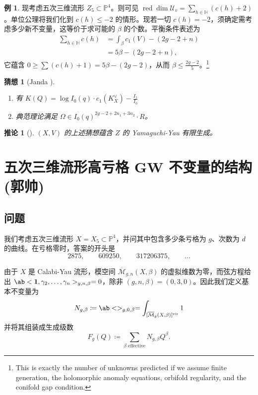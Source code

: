 \documentclass{amsart}
\newtheorem{cor}[thm]{推论}
\newtheorem{conj}[thm]{猜想}
\theoremstyle{definition}
\newtheorem{exm}[thm]{例}
\theoremstyle{remark}
\theoremstyle{plain}
\theoremstyle{definition}
\theoremstyle{remark}
\renewcommand{\H}{\mathbb{H}}
\renewcommand{\P}{\mathbb{P}}
\newcommand{\Mbar}{\overline{\mathcal{M}}}
\newcommand{\mc}[1]{\mathcal{#1}}
\newcommand{\mr}[1]{\mathrm{#1}}
\newcommand{\on}[1]{\operatorname{#1}}
\newcommand{\1}{\mathbf{1}}
\newcommand{\2}{\mathbf{2}}
\newcommand{\3}{\mathbf{3}}
\newcommand{\vir}{\mr{vir}}
\begin{document}
\begin{exm}
    现考虑五次三维流形 \(Z_5 \subset \P^4\)。则可见 \(\on{red}\dim \mc{U}_v = \sum_{h \in \H} (c(h)+2)\)。单位公理将我们化到 \(c(h) \leq -2\) 的情形。现若一切 \(c(h) = -2\)，须确定需考虑多少新不变量，这等价于求可能的 \(\beta\) 的个数。平衡条件表述为
    \begin{align*}
        \sum_{h \in \H} c(h) &= \int_{\beta} c_1(V) - (2g-2+n) \\
        &= 5\beta - (2g-2+n),
    \end{align*}
    它蕴含 \(0 \geq \sum (c(h)+1) = 5\beta - (2g-2)\)，从而 \(\beta \leq \frac{2g-2}{5}\)。\footnote{This is exactly the number of unknowns predicted if we assume finite generation, the holomorphic anomaly equations, orbifold regularity, and the conifold gap condition.}
\end{exm}

\begin{conj}[Janda {\cite[Conjecture~1.6]{CJRtropical2025}}]\leavevmode
    \begin{enumerate}
        \item 有 \(K(Q) = \log I_0(q) \cdot c_1(K_X^{\vee}) - \frac{I_1}{I_0}\) \\
        \item 典范理论满足 \(\Omega \in I_0(q)^{2g-2+2n_1 + 3 n_2} \cdot R\)。
    \end{enumerate}
\end{conj}

\begin{cor}[{\cite[Theorem~1.7]{CJRtropical2025}}]
    \((X, V)\) 的上述猜想蕴含 \(Z\) 的 Yamaguchi-Yau 有限生成。
\end{cor}
\section{五次三维流形高亏格 GW 不变量的结构 (郭帅)}%
\label{sec:Structure of higher-genus GW invariants of the quintic (Shuai Guo)}

\subsection{问题}%
\label{sub:The problem (Guo)}

我们考虑五次三维流形 \(X = X_5 \subset \P^4\)，并问其中包含多少条亏格为 \(g\)、次数为 \(d\) 的曲线。在亏格零时，答案的开头是
\[ 2875, \qquad 609250, \qquad 317206375, \qquad \ldots \]

由于 \(X\) 是 Calabi-Yau 流形，模空间 \(\Mbar_{g,n}(X,\beta)\) 的虚拟维数为零，而弦方程给出 \(\ab<\1, \gamma_2, \ldots, \gamma_n>_{g,n,\beta} = 0\)，除非 \((g,n,\beta) = (0,3,0)\)。因此我们定义基本不变量为
\[ N_{g,\beta} \coloneqq \ab<>_{g,0,\beta} = \int_{[\Mbar_g(X,\beta)]^{\vir}} 1 \]
并将其组装成生成级数
\[ F_g(Q) \coloneqq \sum_{\beta \text{ effective}} N_{g,\beta}Q^{\beta}. \]
\end{document}
